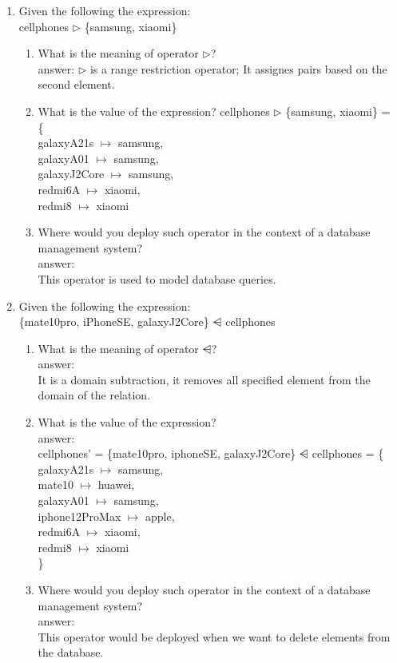 \documentclass[12pt]{article}
\begin{document}
\begin{enumerate}
	\item Given the following the expression:\\ cellphones $\rhd$ \{samsung, xiaomi\}
	\begin{enumerate} 
		\item What is the meaning of operator $\rhd$? \\
		answer: 
		$\rhd$ is a range restriction operator; It assignes pairs based on the second element.
		\item What is the value of the expression?
		cellphones $\rhd$ \{samsung, xiaomi\} = \\
		\{ \\
		galaxyA21s $\mapsto$ samsung, \\
		galaxyA01 $\mapsto$ samsung, \\
		galaxyJ2Core $\mapsto$ samsung, \\
		redmi6A $\mapsto$ xiaomi,\\
		redmi8 $\mapsto$ xiaomi
		\item Where would you deploy such operator in the context of a database management system? \\ 
		answer: \\ 
		This operator is used to model database queries.
	\end{enumerate}

	\item Given the following the expression:\\ \{mate10pro, iPhoneSE, galaxyJ2Core\} $\ndres$ cellphones 
	\begin{enumerate} 
		\item What is the meaning of operator $\ndres$?\\
		answer:\\ 
		It is a domain subtraction, it removes all specified element from the domain of the relation.
		\item What is the value of the expression?	\\
		answer:\\
		\indent cellphones' = \{mate10pro, iphoneSE, galaxyJ2Core\}  $\ndres$ cellphones = \{ \\
		galaxyA21s $\mapsto$ samsung,\\
		mate10 $\mapsto$ huawei,\\
		galaxyA01 $\mapsto$ samsung,\\
		iphone12ProMax $\mapsto$ apple,\\
		redmi6A $\mapsto$ xiaomi,\\
		redmi8 $\mapsto$ xiaomi\\
		\}
		\item Where would you deploy such operator in the context of a database management system?\\
		answer:\\
		This operator would be deployed when we want to delete elements from the database.
	\end{enumerate}


\end{enumerate}
\end{document}
